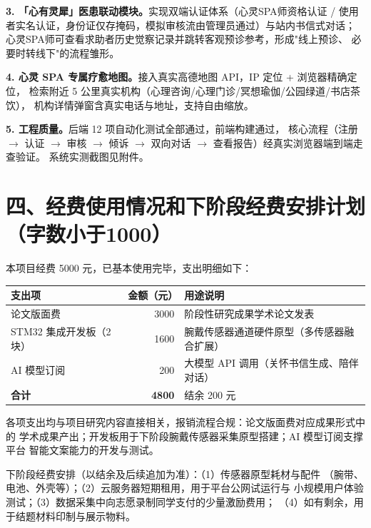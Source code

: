 \documentclass[12pt, a4paper]{ctexart}
\begin{document}
\textbf{3. 「心有灵犀」医患联动模块。}实现双端认证体系（心灵SPA师资格认证 /
使用者实名认证，身份证仅存掩码，模拟审核流由管理员通过）与站内书信式对话；
心灵SPA师可查看求助者历史觉察记录并跳转客观预诊参考，形成"线上预诊、
必要时转线下"的流程雏形。

\textbf{4. 心灵 SPA 专属疗愈地图。}接入真实高德地图 API，IP 定位 + 浏览器精确定位，
检索附近 5 公里真实机构（心理咨询/心理门诊/冥想瑜伽/公园绿道/书店茶饮），
机构详情弹窗含真实电话与地址，支持自由缩放。

\textbf{5. 工程质量。}后端 12 项自动化测试全部通过，前端构建通过，
核心流程（注册 $\rightarrow$ 认证 $\rightarrow$ 审核 $\rightarrow$ 倾诉
$\rightarrow$ 双向对话 $\rightarrow$ 查看报告）经真实浏览器端到端走查验证。
系统实测截图见附件。

\section*{四、经费使用情况和下阶段经费安排计划（字数小于1000）}

本项目经费 5000 元，已基本使用完毕，支出明细如下：

\begin{center}
\renewcommand{\arraystretch}{1.35}
\begin{tabular}{L{4.6cm} r L{7.2cm}}
\toprule
\textbf{支出项} & \textbf{金额（元）} & \textbf{用途说明} \\
\midrule
论文版面费 & 3000 & 阶段性研究成果学术论文发表 \\
STM32 集成开发板（2 块） & 1600 & 腕戴传感器通道硬件原型（多传感器融合扩展） \\
AI 模型订阅 & 200 & 大模型 API 调用（关怀书信生成、陪伴对话） \\
\midrule
\textbf{合计} & \textbf{4800} & 结余 200 元 \\
\bottomrule
\end{tabular}
\end{center}

各项支出均与项目研究内容直接相关，报销流程合规：论文版面费对应成果形式中的
学术成果产出；开发板用于下阶段腕戴传感器采集原型搭建；AI 模型订阅支撑平台
智能文案能力的开发与测试。

下阶段经费安排（以结余及后续追加为准）：（1）传感器原型耗材与配件
（腕带、电池、外壳等）；（2）云服务器短期租用，用于平台公网试运行与
小规模用户体验测试；（3）数据采集中向志愿录制同学支付的少量激励费用；
（4）如有剩余，用于结题材料印制与展示物料。

\end{document}
